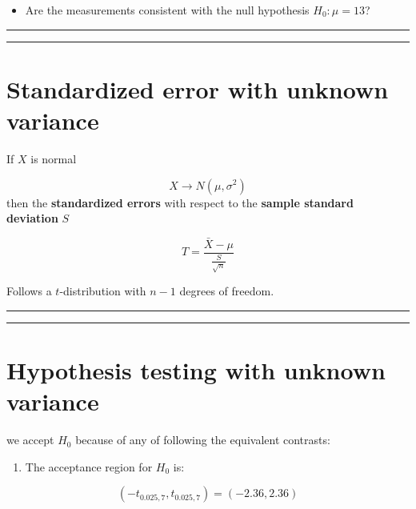 \documentclass[
]{book}
\providecommand{\tightlist}{%
  \setlength{\itemsep}{0pt}\setlength{\parskip}{0pt}}
\begin{document}
\begin{itemize}
\tightlist
\item
  Are the measurements consistent with the null hypothesis \(H_0: \mu=13\)?
\end{itemize}

\begin{center}\rule{0.5\linewidth}{0.5pt}\end{center}

\begin{center}\rule{0.5\linewidth}{0.5pt}\end{center}

\hypertarget{standardized-error-with-unknown-variance}{%
\section{Standardized error with unknown variance}\label{standardized-error-with-unknown-variance}}

If \(X\) is normal

\[X \rightarrow N(\mu, \sigma^2)\] then the \textbf{standardized errors} with respect to the \textbf{sample standard deviation} \(S\)

\[T=\frac{\bar{X}-\mu}{\frac{S}{\sqrt{n}}}\]

Follows a \(t\)-distribution with \(n-1\) degrees of freedom.

\begin{center}\rule{0.5\linewidth}{0.5pt}\end{center}

\begin{center}\rule{0.5\linewidth}{0.5pt}\end{center}

\hypertarget{hypothesis-testing-with-unknown-variance}{%
\section{Hypothesis testing with unknown variance}\label{hypothesis-testing-with-unknown-variance}}

we accept \(H_0\) because of any of following the equivalent contrasts:

\begin{enumerate}
\def\labelenumi{\arabic{enumi}.}
\tightlist
\item
  The acceptance region for \(H_0\) is:
\end{enumerate}

\[(-t_{0.025,7}, t_{0.025,7})=( -2.36,  2.36)\]
\end{document}
